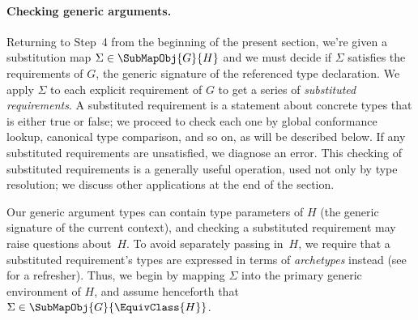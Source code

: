 \documentclass[../generics]{subfiles}
\begin{document}
\paragraph{Checking generic arguments.}
Returning to Step~4 from the beginning of the present section, we're given a substitution map $\Sigma\in\SubMapObj{G}{H}$ and we must decide if $\Sigma$ satisfies the requirements of $G$, the generic signature of the referenced type declaration. We apply $\Sigma$ to each explicit requirement of $G$ to get a series of \emph{substituted requirements}. A substituted requirement is a statement about concrete types that is either true or false; we proceed to check each one by global conformance lookup, canonical type comparison, and so on, as will be described below. If any substituted requirements are unsatisfied, we diagnose an error. This checking of substituted requirements is a generally useful operation, used not only by type resolution; we discuss other applications at the end of the section.

Our generic argument types can contain type parameters of $H$ (the generic signature of the current context), and checking a substituted requirement may raise questions about~$H$. To avoid separately passing in~$H$, we require that a substituted requirement's types are expressed in terms of \emph{archetypes} instead (see  for a refresher). Thus, we begin by mapping $\Sigma$ into the primary generic environment of $H$, and assume henceforth that $\Sigma\in\SubMapObj{G}{\EquivClass{H}}$.
\end{document}
